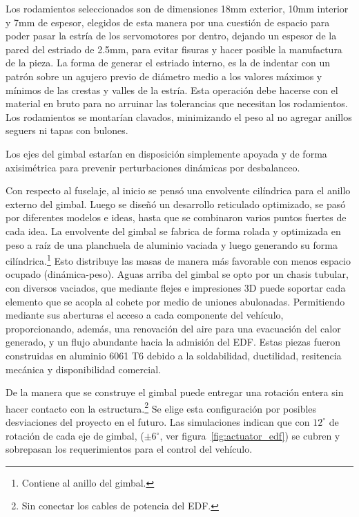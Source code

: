 \medskip

Los rodamientos seleccionados son de dimensiones 18mm exterior, 10mm interior y 7mm de espesor,
elegidos de esta manera por una cuestión de espacio para poder pasar la estría de los
servomotores por dentro, dejando un espesor de la pared del estriado de 2.5mm,
para evitar fisuras y hacer posible la manufactura de la pieza. La forma de generar el estriado
interno, es la de indentar con un patrón sobre un agujero previo de diámetro medio a los
valores máximos y mínimos de las crestas y valles de la estría. Esta operación debe hacerse con
el material en bruto para no arruinar las tolerancias que necesitan los rodamientos. Los
rodamientos se montarían clavados, minimizando el peso al no agregar anillos seguers ni tapas con
bulones.

\medskip 

Los ejes del gimbal estarían en disposición simplemente apoyada y de forma axisimétrica para prevenir perturbaciones dinámicas por desbalanceo.

\medskip

Con respecto al fuselaje, al inicio se pensó una envolvente cilíndrica para el anillo externo del
gimbal. Luego se diseñó un desarrollo reticulado optimizado, se pasó por diferentes modelos e
ideas, hasta que se combinaron varios puntos fuertes de cada idea. La envolvente del gimbal se fabrica de forma rolada y optimizada en peso a raíz de
una planchuela de aluminio vaciada y luego generando su forma cilíndrica.\footnote{Contiene al
anillo del gimbal.} Esto distribuye las masas de manera más favorable con menos espacio
ocupado (dinámica-peso). Aguas arriba del gimbal se opto por un chasis tubular, con diversos
vaciados, que mediante flejes e impresiones 3D puede soportar cada elemento que se acopla al cohete por
medio de uniones abulonadas. Permitiendo mediante sus aberturas el acceso a cada
componente del vehículo, proporcionando, además, una renovación del aire para una
evacuación del calor generado, y un flujo abundante hacia la admisión del EDF. Estas piezas fueron construidas en aluminio 6061 T6 debido a la soldabilidad, ductilidad, resitencia mecánica y disponibilidad comercial.

\medskip

De la manera que se construye el gimbal puede entregar una rotación entera sin hacer contacto con la estructura.\footnote{Sin conectar los cables de potencia del EDF.} Se elige esta configuración por posibles desviaciones del proyecto en el
futuro. Las simulaciones indican que con $12^\circ$ de rotación de cada eje de gimbal, ($\pm$6$^\circ$, ver figura~\ref{fig:actuator_edf}) se cubren y sobrepasan los requerimientos para el control del vehículo.

